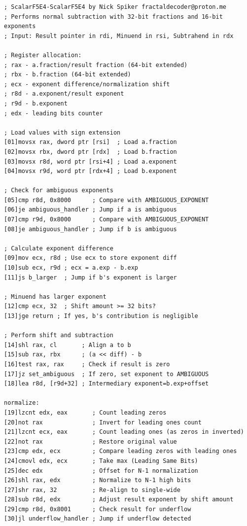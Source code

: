 \documentclass[12pt,letter]{article}
\begin{document}
\newpage
\begin{lstlisting}[style=rust, caption={Assembly Implementation of Scalar Subtraction}, label={fig:scalar_subtract}]
; ScalarF5E4-ScalarF5E4 by Nick Spiker fractaldecoder@proton.me
; Performs normal subtraction with 32-bit fractions and 16-bit exponents
; Input: Result pointer in rdi, Minuend in rsi, Subtrahend in rdx

; Register allocation:
; rax - a.fraction/result fraction (64-bit extended)
; rbx - b.fraction (64-bit extended)
; ecx - exponent difference/normalization shift
; r8d - a.exponent/result exponent
; r9d - b.exponent
; edx - leading bits counter

; Load values with sign extension
[01]movsx rax, dword ptr [rsi]  ; Load a.fraction
[02]movsx rbx, dword ptr [rdx]  ; Load b.fraction
[03]movsx r8d, word ptr [rsi+4] ; Load a.exponent
[04]movsx r9d, word ptr [rdx+4] ; Load b.exponent

; Check for ambiguous exponents
[05]cmp r8d, 0x8000      ; Compare with AMBIGUOUS_EXPONENT
[06]je ambiguous_handler ; Jump if a is ambiguous
[07]cmp r9d, 0x8000      ; Compare with AMBIGUOUS_EXPONENT
[08]je ambiguous_handler ; Jump if b is ambiguous

; Calculate exponent difference
[09]mov ecx, r8d ; Use ecx to store exponent diff
[10]sub ecx, r9d ; ecx = a.exp - b.exp
[11]js b_larger  ; Jump if b's exponent is larger

; Minuend has larger exponent
[12]cmp ecx, 32  ; Shift amount >= 32 bits?
[13]jge return ; If yes, b's contribution is negligible

; Perform shift and subtraction
[14]shl rax, cl       ; Align a to b
[15]sub rax, rbx      ; (a << diff) - b
[16]test rax, rax     ; Check if result is zero
[17]jz set_ambiguous  ; If zero, set exponent to AMBIGUOUS
[18]lea r8d, [r9d+32] ; Intermediary exponent=b.exp+offset

normalize:
[19]lzcnt edx, eax       ; Count leading zeros
[20]not rax              ; Invert for leading ones count
[21]lzcnt ecx, eax       ; Count leading ones (as zeros in inverted)
[22]not rax              ; Restore original value
[23]cmp edx, ecx         ; Compare leading zeros with leading ones
[24]cmovl edx, ecx       ; Take max (Leading Same Bits)
[25]dec edx              ; Offset for N-1 normalization
[26]shl rax, edx         ; Normalize to N-1 high bits
[27]shr rax, 32          ; Re-align to single-wide
[28]sub r8d, edx         ; Adjust result exponent by shift amount
[29]cmp r8d, 0x8001      ; Check result for underflow
[30]jl underflow_handler ; Jump if underflow detected


\end{lstlisting}
\end{document}
